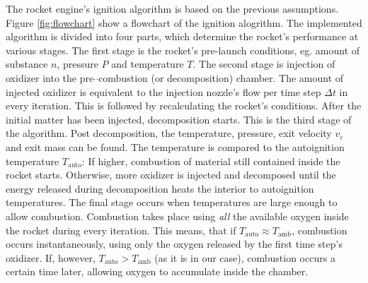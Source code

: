   The rocket engine's ignition algorithm is based on the previous assumptions. Figure \ref{fig:flowchart} show a flowchart of the ignition alogrithm. The implemented algorithm is divided into four parts, which determine the rocket's performance at various stages. The first stage is the rocket's pre-launch conditions, eg. amount of substance $n$, pressure $P$ and temperature $T$. The second stage is injection of oxidizer into the pre--combustion (or decomposition) chamber. The amount of injected oxidizer is equivalent to the injection nozzle's flow per time step $\Delta t$ in every iteration. This is followed by recalculating the rocket's conditions. After the initial matter has been injected, decomposition starts. This is the third stage of the algorithm. Post decomposition, the temperature, pressure, exit velocity $v_e$ and exit mass can be found. The temperature is compared to the autoignition temperature $T_\text{auto}$: If higher, combustion of material still contained inside the rocket starts. Otherwise, more oxidizer is injected and decomposed until the energy released during decomposition heats the interior to autoignition temperatures. The final stage occurs when temperatures are large enough to allow combustion. Combustion takes place using \emph{all} the available oxygen inside the rocket during every iteration. This means, that if $T_\text{auto} \approx T_\text{amb}$, combustion occurs instantaneously, using only the oxygen released by the first time step's oxidizer. If, however, $T_\text{auto} > T_\text{amb}$ (as it is in our case), combustion occurs a certain time later, allowing oxygen to accumulate inside the chamber.




